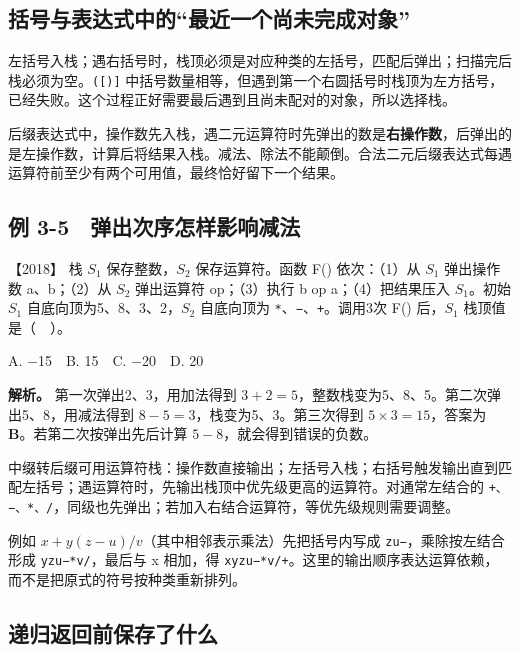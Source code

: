 \subsection{括号与表达式中的``最近一个尚未完成对象''}\label{ds-c03-h132}

左括号入栈；遇右括号时，栈顶必须是对应种类的左括号，匹配后弹出；扫描完后栈必须为空。\allowbreak{}\texttt{({[}){]}} 中括号数量相等，但遇到第一个右圆括号时栈顶为左方括号，已经失败。这个过程正好需要最后遇到且尚未配对的对象，所以选择栈。

后缀表达式中，操作数先入栈，遇二元运算符时先弹出的数是\textbf{右操作数}，后弹出的是左操作数，计算后将结果入栈。减法、除法不能颠倒。合法二元后缀表达式每遇运算符前至少有两个可用值，最终恰好留下一个结果。

\subsection{例 3-5　弹出次序怎样影响减法}\label{ds-ex3-5}

\noindent{}【2018】 栈 \(S_1\) 保存整数，\(S_2\) 保存运算符。函数 F() 依次：（1）从 \(S_1\) 弹出操作数 a、b；（2）从 \(S_2\) 弹出运算符 op；（3）执行 b op a；（4）把结果压入 \(S_1\)。初始 \(S_1\) 自底向顶为5、8、3、2，\(S_2\) 自底向顶为 \allowbreak{}\texttt{*}、\allowbreak{}\texttt{−}、\allowbreak{}\texttt{+}。调用3次 F() 后，\(S_1\) 栈顶值是（　）。

A. −15　B. 15　C. −20　D. 20


\textbf{解析。} 第一次弹出2、3，用加法得到 \(3+2=5\)，整数栈变为5、8、5。第二次弹出5、8，用减法得到 \(8-5=3\)，栈变为5、3。第三次得到 \(5\times3=15\)，答案为 \textbf{B}。若第二次按弹出先后计算 \(5-8\)，就会得到错误的负数。

中缀转后缀可用运算符栈：操作数直接输出；左括号入栈；右括号触发输出直到匹配左括号；遇运算符时，先输出栈顶中优先级更高的运算符。对通常左结合的 \allowbreak{}\texttt{+、−、*、/}，同级也先弹出；若加入右结合运算符，等优先级规则需要调整。

例如 \(x+y(z-u)/v\)（其中相邻表示乘法）先把括号内写成 \allowbreak{}\texttt{zu−}，乘除按左结合形成 \allowbreak{}\texttt{yzu−*v/}，最后与 x 相加，得 \allowbreak{}\texttt{xyzu−*v/+}。这里的输出顺序表达运算依赖，而不是把原式的符号按种类重新排列。

\subsection{递归返回前保存了什么}\label{ds-c03-h150}

